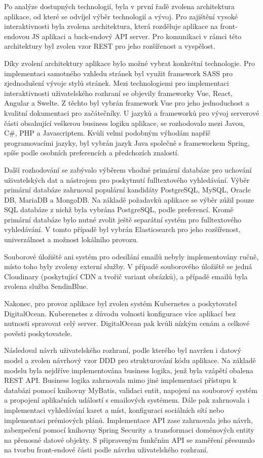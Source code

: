 Po analýze dostupných technologií, byla v první řadě zvolena architektura aplikace, od které se odvíjel výběr technologií a vývoj.
Pro zajištění vysoké interaktivnosti byla zvolena architektura, která rozděluje aplikace na front-endovou \ac{JS} aplikaci a back-endový
\ac{API} server.
Pro komunikaci v rámci této architektury byl zvolen vzor \ac{REST} pro jeho rozšířenost a vyspělost.

Díky zvolení architektury aplikace bylo možné vybrat konkrétní technologie.
Pro implementaci samotného vzhledu stránek byl využit framework \ac{SASS} pro zjednodušení vývoje stylů stránek.
Mezi technologiemi pro implementaci interaktivnosti uživatelského rozhraní se objevily frameworky Vue, React, Angular a Swelte.
Z těchto byl vybrán framework Vue pro jeho jednoduchost a kvalitní dokumentaci pro začátečníky.
U jazyků a frameworků pro vývoj serverové části obsahující veškerou business logiku aplikace, se rozhodovalo mezi Javou,
C\#, PHP a Javascriptem.
Kvůli velmi podobným výhodám napříč programovacími jazyky, byl vybrán jazyk Java společně s frameworkem Spring, spíše podle
osobních preferencích a předchozích znalostí.

Další rozhodování se zabývalo výběrem vhodné primární databáze pro uchování uživatelských dat a nástrojem pro
poskytnutí fulltextového vyhledávání.
Výběr primární databáze zahrnoval populární kandidáty PostgreSQL, MySQL, Oracle DB, MariaDB a MongoDB.
Na základě požadavků aplikace se výběr zúžil pouze \ac{SQL} databáze z nichž byla vybrána PostgreSQL, podle preferencí.
Kromě primární databáze bylo nutné zvolit ještě separátní systém pro fulltextového vyhledávání.
V tomto případě byl vybrán Elasticsearch pro jeho rozšířenost, univerzálnost a možnost lokálního provozu.

Souborové úložiště ani systém pro odesílání emailů nebyly implementovány ručně, místo toho byly zvoleny externí služby.
V případě souborového úložiště se jedná Cloudinary (poskytující \ac{CDN} a tvořič variant obrázků), a případě
emailů byla zvolena služba SendinBlue.

Nakonec, pro provoz aplikace byl zvolen systém Kubernetes a poskytovatel DigitalOcean.
Kuberenetes z důvodu volnosti konfigurace více aplikací bez nutnosti spravovat celý server.
DigitalOcean pak kvůli nízkým cenám a celkové pověsti poskytovatele.

Následoval návrh uživatelského rozhraní, podle kterého byl navržen i datový model a zvolen návrhový vzor \ac{DDD} pro strukturování
kódu aplikace.
Na základě modelu byla nejdříve implementována business logika, jenž byla vzápětí obalena \ac{REST} \ac{API}.
Business logika zahrnovala mimo jiné implementaci přístupu k databázi pomocí knihovny MyBatis, validaci entit, napojení
na souborový systém a propojení aplikačních událostí s emailových systémem.
Dále pak zahrnovala i implementaci vyhledávání karet a míst, konfiguraci sociálních sítí nebo implementaci prémiových plánů.
Implementace \ac{API} zase zahrnovala jeho návrh, zabezpečení pomocí knihovny Spring Security a transformaci
doménových entity na přenosné datové objekty.
S připraveným funkčním \ac{API} se zaměření přesunulo na tvorbu front-endové části podle návrhu uživatelského rozhraní.

